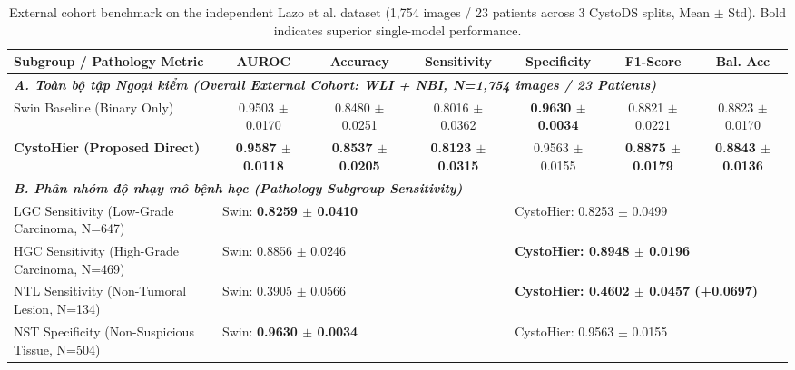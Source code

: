 \documentclass[runningheads]{llncs}
\begin{document}
\begin{table}[t]
\centering
\caption{External cohort benchmark on the independent Lazo et al. dataset (1,754 images / 23 patients across 3 CystoDS splits, Mean $\pm$ Std). Bold indicates superior single-model performance.}
\label{tab:external_validation}
\begin{adjustbox}{max width=\textwidth}
\begin{tabular}{lcccccc}
\toprule
\textbf{Subgroup / Pathology Metric} & \textbf{AUROC} & \textbf{Accuracy} & \textbf{Sensitivity} & \textbf{Specificity} & \textbf{F1-Score} & \textbf{Bal. Acc} \\
\midrule
\multicolumn{7}{l}{\textit{\textbf{A. Toàn bộ tập Ngoại kiểm (Overall External Cohort: WLI + NBI, N=1,754 images / 23 Patients)}}} \\
Swin Baseline (Binary Only) & 0.9503 $\pm$ 0.0170 & 0.8480 $\pm$ 0.0251 & 0.8016 $\pm$ 0.0362 & \textbf{0.9630 $\pm$ 0.0034} & 0.8821 $\pm$ 0.0221 & 0.8823 $\pm$ 0.0170 \\
\textbf{CystoHier (Proposed Direct)} & \textbf{0.9587 $\pm$ 0.0118} & \textbf{0.8537 $\pm$ 0.0205} & \textbf{0.8123 $\pm$ 0.0315} & 0.9563 $\pm$ 0.0155 & \textbf{0.8875 $\pm$ 0.0179} & \textbf{0.8843 $\pm$ 0.0136} \\
\midrule
\multicolumn{7}{l}{\textit{\textbf{B. Phân nhóm độ nhạy mô bệnh học (Pathology Subgroup Sensitivity)}}} \\
\quad LGC Sensitivity (Low-Grade Carcinoma, N=647) & \multicolumn{3}{l}{Swin: \textbf{0.8259 $\pm$ 0.0410}} & \multicolumn{3}{l}{CystoHier: 0.8253 $\pm$ 0.0499} \\
\quad HGC Sensitivity (High-Grade Carcinoma, N=469) & \multicolumn{3}{l}{Swin: 0.8856 $\pm$ 0.0246} & \multicolumn{3}{l}{\textbf{CystoHier: 0.8948 $\pm$ 0.0196}} \\
\quad NTL Sensitivity (Non-Tumoral Lesion, N=134) & \multicolumn{3}{l}{Swin: 0.3905 $\pm$ 0.0566} & \multicolumn{3}{l}{\textbf{CystoHier: 0.4602 $\pm$ 0.0457 (+0.0697)}} \\
\quad NST Specificity (Non-Suspicious Tissue, N=504) & \multicolumn{3}{l}{Swin: \textbf{0.9630 $\pm$ 0.0034}} & \multicolumn{3}{l}{CystoHier: 0.9563 $\pm$ 0.0155} \\
\bottomrule
\end{tabular}
\end{adjustbox}
\end{table}
\end{document}
